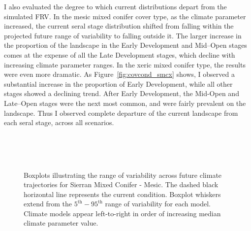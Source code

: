 I also evaluated the degree to which current distributions depart from the simulated FRV.%
%
In the mesic mixed conifer cover type, as the climate parameter increased, the current seral stage distribution shifted from falling within the projected future range of variability to falling outside it. The larger increase in the proportion of the landscape in the Early Development and Mid--Open stages comes at the expense of all the Late Development stages, which decline with increasing climate parameter ranges.
%
In the xeric mixed conifer type, the results were even more dramatic. As Figure~\ref{fig:covcond_smcx} shows, I observed a substantial increase in the proportion of Early Development, while all other stages showed a declining trend. After Early Development, the Mid-Open and Late--Open stages were the next most common, and were fairly prevalent on the landscape. Thus I observed complete departure of the current landscape from each seral stage, across all scenarios.

\begin{figure}[htbp]
 \captionsetup[subfigure]{labelformat=empty}
  \centering
   \\
   \\
     \\
  \caption{Boxplots illustrating the range of variability across future climate trajectories for Sierran Mixed Conifer - Mesic. The dashed black horizontal line represents the current condition. Boxplot whiskers extend from the $5^{\text{th}} - 95^{\text{th}}$ range of variability for each model. Climate models appear left-to-right in order of increasing median climate parameter value.}
  \label{fig:covcond_smcm}
\end{figure} %

